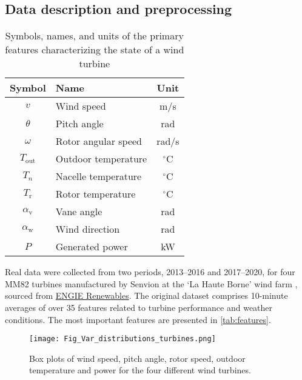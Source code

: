 \documentclass[preprint,12pt]{elsarticle}
\begin{document}
\subsection{Data description and preprocessing}

\begin{table}[t]
\centering
\footnotesize
\begin{tabular}{clc}
\hline
\textbf{Symbol} & \textbf{Name}       & \textbf{Unit}       \\           \hline
$v$              & Wind speed                  & m/s                      \\ 
$\theta$         & Pitch angle                     & rad                   \\   
$\omega$         & Rotor angular speed          & rad/s                    \\ 
$T_\text{out}$              & Outdoor temperature                    & $^\circ$C  \\ 
$T_n$              & Nacelle temperature                    & $^\circ$C           \\ 
$T_\text{r}$              & Rotor temperature                    & $^\circ$C      \\
$\alpha_\text{v}$              & Vane angle                    & rad       \\ 
$\alpha_\text{w}$              & Wind direction                    & rad   \\ 
$P$              & Generated power                    & kW                  \\ \hline
\end{tabular}
\caption{Symbols, names, and units of the primary features characterizing the state of a wind turbine}
\label{tab:features}
\end{table}

Real data were collected from two periods, 2013–2016 and 2017–2020, for four MM82 turbines manufactured by Senvion at the `La Haute Borne' wind farm \cite{LaHauteBorne1,LaHauteBorne2}, sourced from \href{https://www.engie.com/en}{ENGIE Renewables}. The original dataset comprises 10-minute averages of over 35 features related to turbine performance and weather conditions. The most important features are presented in \autoref{tab:features}.

\begin{figure}[t]
    \centering
    \texttt{[image: Fig\_Var\_distributions\_turbines.png]}
    \caption{Box plots of wind speed, pitch angle, rotor speed, outdoor temperature and power for the four different wind turbines.}
    \label{fig:Vdistro}
\end{figure}
\end{document}
